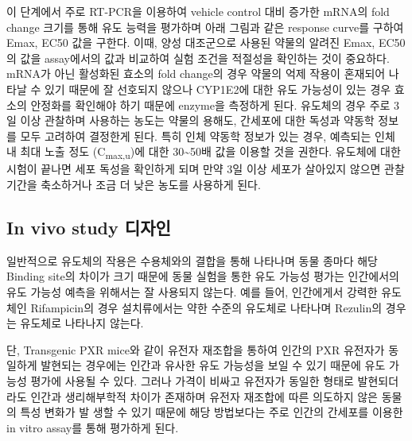 \documentclass[
  11pt,
  krantz2, a4paper, twoside]{krantz}
\begin{document}
이 단계에서 주로 RT-PCR을 이용하여 vehicle control 대비 증가한 mRNA의
fold change 크기를 통해 유도 능력을 평가하며 아래 그림과 같은 response
curve를 구하여 Emax, EC50 값을 구한다. 이때, 양성 대조군으로 사용된
약물의 알려진 Emax, EC50의 값을 assay에서의 값과 비교하여 실험 조건을
적절성을 확인하는 것이 중요하다. mRNA가 아닌 활성화된 효소의 fold
change의 경우 약물의 억제 작용이 혼재되어 나타날 수 있기 때문에 잘
선호되지 않으나 CYP1E2에 대한 유도 가능성이 있는 경우 효소의 안정화를
확인해야 하기 때문에 enzyme을 측정하게 된다. 유도체의 경우 주로 3일 이상
관찰하며 사용하는 농도는 약물의 용해도, 간세포에 대한 독성과 약동학
정보를 모두 고려하여 결정한게 된다. 특히 인체 약동학 정보가 있는 경우,
예측되는 인체 내 최대 노출 정도 (C\textsubscript{max,u})에 대한 30\textasciitilde50배 값을 이용할
것을 권한다. 유도체에 대한 시험이 끝나면 세포 독성을 확인하게 되며 만약
3일 이상 세포가 살아있지 않으면 관찰 기간을 축소하거나 조금 더 낮은
농도를 사용하게 된다.

\subsection{In vivo study 디자인}\label{in-vivo-study-uxb514uxc790uxc778}

일반적으로 유도체의 작용은 수용체와의 결합을 통해 나타나며 동물 종마다
해당 Binding site의 차이가 크기 때문에 동물 실험을 통한 유도 가능성
평가는 인간에서의 유도 가능성 예측을 위해서는 잘 사용되지 않는다. 예를
들어, 인간에게서 강력한 유도체인 Rifampicin의 경우 설치류에서는 약한
수준의 유도체로 나타나며 Rezulin의 경우는 유도체로 나타나지 않는다.

단, Transgenic PXR mice와 같이 유전자 재조합을 통하여 인간의 PXR
유전자가 동일하게 발현되는 경우에는 인간과 유사한 유도 가능성을 보일 수
있기 때문에 유도 가능성 평가에 사용될 수 있다. 그러나 가격이 비싸고
유전자가 동일한 형태로 발현되더라도 인간과 생리해부학적 차이가 존재하며
유전자 재조합에 따른 의도하지 않은 동물의 특성 변화가 발 생할 수 있기
때문에 해당 방법보다는 주로 인간의 간세포를 이용한 in vitro assay를 통해
평가하게 된다.
\end{document}
